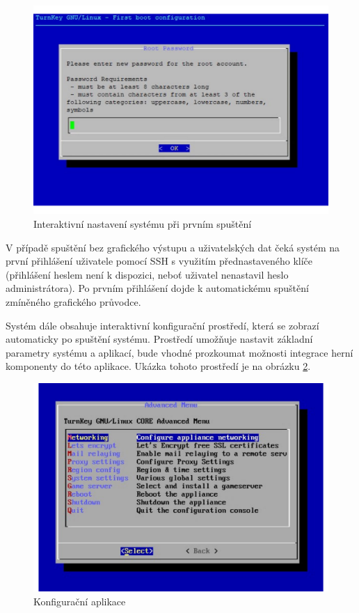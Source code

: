 \begin{figure}[h]
    \centering
    \includegraphics[width=1\linewidth]{chapters/images/root-pass.pdf}
    \caption{Interaktivní nastavení systému při prvním spuštění}
    \label{fig:inithooks-password}
\end{figure}

V případě spuštění bez grafického výstupu a uživatelských dat čeká systém na první přihlášení uživatele pomocí SSH s využitím přednastaveného klíče (přihlášení heslem
není k dispozici, neboť uživatel nenastavil heslo administrátora). Po prvním přihlášení dojde k automatickému spuštění zmíněného grafického průvodce.

Systém dále obsahuje interaktivní konfigurační prostředí, která se zobrazí automaticky po spuštění systému.
Prostředí umožňuje nastavit základní parametry systému a aplikací, bude vhodné prozkoumat možnosti integrace herní komponenty do této aplikace.
Ukázka tohoto prostředí je na obrázku \ref{fig:confconsole}.

\begin{figure}[h]
    \centering
    \includegraphics[width=1\linewidth]{chapters/images/confconsole.pdf}
    \caption{Konfigurační aplikace}
    \label{fig:confconsole}
\end{figure}


